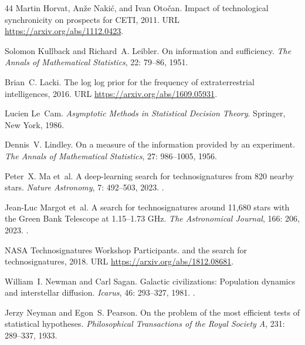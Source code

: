 \documentclass[11pt,a4paper]{article}
\begin{document}
\begin{thebibliography}{44}
Martin Horvat, An{\v z}e Naki{\'c}, and Ivan Oto{\v c}an.
\newblock Impact of technological synchronicity on prospects for {CETI}, 2011.
\newblock URL \url{https://arxiv.org/abs/1112.0423}.

Solomon Kullback and Richard~A. Leibler.
\newblock On information and sufficiency.
\newblock \emph{The Annals of Mathematical Statistics}, 22: 79--86,
  1951.

Brian~C. Lacki.
\newblock The log log prior for the frequency of extraterrestrial
  intelligences, 2016.
\newblock URL \url{https://arxiv.org/abs/1609.05931}.

Lucien Le~Cam.
\newblock \emph{Asymptotic Methods in Statistical Decision Theory}.
\newblock Springer, New York, 1986.

Dennis~V. Lindley.
\newblock On a measure of the information provided by an experiment.
\newblock \emph{The Annals of Mathematical Statistics}, 27: 986--1005,
  1956.

Peter~X. Ma et~al.
\newblock A deep-learning search for technosignatures from 820 nearby stars.
\newblock \emph{Nature Astronomy}, 7: 492--503, 2023.
\newblock {}.

Jean-Luc Margot et~al.
\newblock A search for technosignatures around 11,680 stars with the {Green
  Bank Telescope} at 1.15--1.73 {GHz}.
\newblock \emph{The Astronomical Journal}, 166: 206, 2023.
\newblock {}.

{NASA Technosignatures Workshop Participants}.
 and the search for technosignatures, 2018.
\newblock URL \url{https://arxiv.org/abs/1812.08681}.

William~I. Newman and Carl Sagan.
\newblock Galactic civilizations: Population dynamics and interstellar
  diffusion.
\newblock \emph{Icarus}, 46: 293--327, 1981.
\newblock {}.

Jerzy Neyman and Egon~S. Pearson.
\newblock On the problem of the most efficient tests of statistical hypotheses.
\newblock \emph{Philosophical Transactions of the Royal Society A},
  231: 289--337, 1933.


\end{thebibliography}
\end{document}
